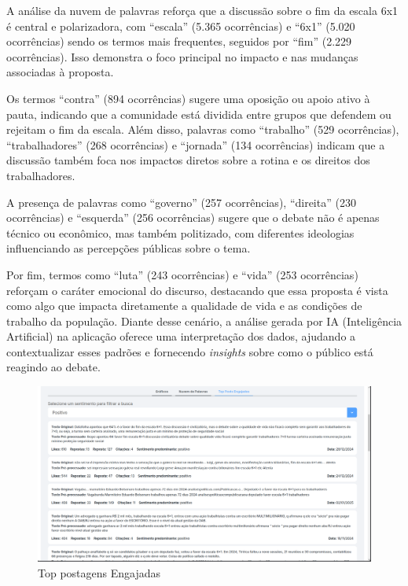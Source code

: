 \documentclass[
	12pt,				%
	oneside,			%
	a4paper,			%
	english,			%
	french,				%
	spanish,			%
	brazil				%
	]{abntex2}
\begin{document}
A análise da nuvem de palavras reforça que a discussão sobre o fim da
escala 6x1 é central e polarizadora, com ``escala'' (5.365 ocorrências)
e ``6x1'' (5.020 ocorrências) sendo os termos mais frequentes, seguidos
por ``fim'' (2.229 ocorrências). Isso demonstra o foco principal no
impacto e nas mudanças associadas à proposta.

Os termos ``contra'' (894 ocorrências) sugere uma oposição ou apoio
ativo à pauta, indicando que a comunidade está dividida entre grupos que
defendem ou rejeitam o fim da escala. Além disso, palavras como
``trabalho'' (529 ocorrências), ``trabalhadores'' (268 ocorrências) e
``jornada'' (134 ocorrências) indicam que a discussão também foca nos
impactos diretos sobre a rotina e os direitos dos trabalhadores.

A presença de palavras como ``governo'' (257 ocorrências), ``direita''
(230 ocorrências) e ``esquerda'' (256 ocorrências) sugere que o debate
não é apenas técnico ou econômico, mas também politizado, com diferentes
ideologias influenciando as percepções públicas sobre o tema.

Por fim, termos como ``luta'' (243 ocorrências) e ``vida'' (253
ocorrências) reforçam o caráter emocional do discurso, destacando que
essa proposta é vista como algo que impacta diretamente a qualidade de
vida e as condições de trabalho da população. Diante desse cenário, a
análise gerada por IA (Inteligência Artificial) na aplicação oferece uma
interpretação dos dados, ajudando a contextualizar esses padrões e
fornecendo \emph{insights} sobre como o público está reagindo ao debate.

\begin{figure}[htbp]
\hypertarget{top_posts_engajados}{%
\caption{Top postagens Engajadas}\label{top_posts_engajados}
\begin{center}
\includegraphics[scale=0.3]{imagens/sentilytics/estudo-caso/top_posts_engajados.png}
\end{center}
}
\end{figure}
\end{document}

